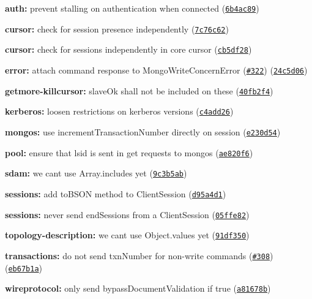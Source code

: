 \begin{DoxyItemize}
\item {\bfseries auth\+:} prevent stalling on authentication when connected (\href{https://github.com/mongodb-js/mongodb-core/commit/6b4ac89}{\tt 6b4ac89})
\item {\bfseries cursor\+:} check for session presence independently (\href{https://github.com/mongodb-js/mongodb-core/commit/7c76c62}{\tt 7c76c62})
\item {\bfseries cursor\+:} check for sessions independently in core cursor (\href{https://github.com/mongodb-js/mongodb-core/commit/cb5df28}{\tt cb5df28})
\item {\bfseries error\+:} attach command response to Mongo\+Write\+Concern\+Error (\href{https://github.com/mongodb-js/mongodb-core/issues/322}{\tt \#322}) (\href{https://github.com/mongodb-js/mongodb-core/commit/24c5d06}{\tt 24c5d06})
\item {\bfseries getmore-\/killcursor\+:} slave\+Ok shall not be included on these (\href{https://github.com/mongodb-js/mongodb-core/commit/40fb2f4}{\tt 40fb2f4})
\item {\bfseries kerberos\+:} loosen restrictions on kerberos versions (\href{https://github.com/mongodb-js/mongodb-core/commit/c4add26}{\tt c4add26})
\item {\bfseries mongos\+:} use {\ttfamily increment\+Transaction\+Number} directly on session (\href{https://github.com/mongodb-js/mongodb-core/commit/e230d54}{\tt e230d54})
\item {\bfseries pool\+:} ensure that lsid is sent in get requests to mongos (\href{https://github.com/mongodb-js/mongodb-core/commit/ae820f6}{\tt ae820f6})
\item {\bfseries sdam\+:} we can\textquotesingle{}t use Array.\+includes yet (\href{https://github.com/mongodb-js/mongodb-core/commit/9c3b5ab}{\tt 9c3b5ab})
\item {\bfseries sessions\+:} add {\ttfamily to\+B\+S\+ON} method to {\ttfamily Client\+Session} (\href{https://github.com/mongodb-js/mongodb-core/commit/d95a4d1}{\tt d95a4d1})
\item {\bfseries sessions\+:} never send {\ttfamily end\+Sessions} from a {\ttfamily Client\+Session} (\href{https://github.com/mongodb-js/mongodb-core/commit/05ffe82}{\tt 05ffe82})
\item {\bfseries topology-\/description\+:} we can\textquotesingle{}t use Object.\+values yet (\href{https://github.com/mongodb-js/mongodb-core/commit/91df350}{\tt 91df350})
\item {\bfseries transactions\+:} do not send txn\+Number for non-\/write commands (\href{https://github.com/mongodb-js/mongodb-core/issues/308}{\tt \#308}) (\href{https://github.com/mongodb-js/mongodb-core/commit/eb67b1a}{\tt eb67b1a})
\item {\bfseries wireprotocol\+:} only send bypass\+Document\+Validation if true (\href{https://github.com/mongodb-js/mongodb-core/commit/a81678b}{\tt a81678b})
\end{DoxyItemize}


